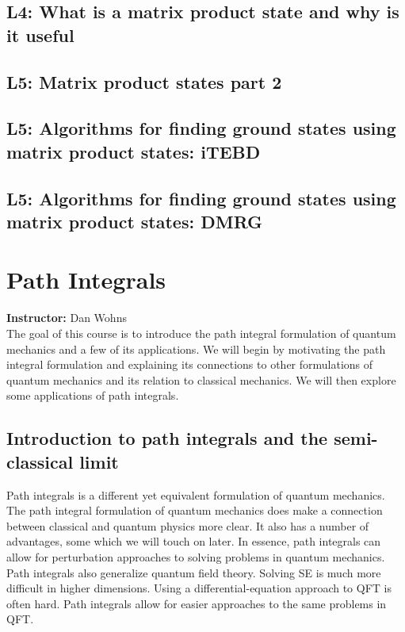 \documentclass{book}
\theoremstyle{definition}
\begin{document}
\section{L4: What is a matrix product state and why is it useful}
\newpage





\section{L5: Matrix product states part 2}




\section{L5: Algorithms for finding ground states using matrix product states: iTEBD }




\section{L5: Algorithms for finding ground states using matrix product states: DMRG}

\newpage











\chapter{Path Integrals}

\textbf{Instructor:} Dan Wohns\\

The goal of this course is to introduce the path integral formulation of quantum mechanics and a few of its applications. We will begin by motivating the path integral formulation and explaining its connections to other formulations of quantum mechanics and its relation to classical mechanics. We will then explore some applications of path integrals.


\newpage

\section{Introduction to path integrals and the semi-classical limit}

Path integrals is a different yet equivalent formulation of quantum mechanics. The path integral formulation of quantum mechanics does make a connection between classical and quantum physics more clear. It also has a number of advantages, some which we will touch on later. In essence, path integrals can allow for perturbation approaches to solving problems in quantum mechanics. Path integrals also generalize quantum field theory. Solving SE is much more difficult in higher dimensions. Using a differential-equation approach to QFT is often hard. Path integrals allow for easier approaches to the same problems in QFT. \\
\end{document}
